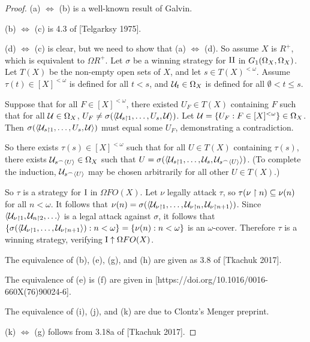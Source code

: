 \documentclass[11pt]{article}
\theoremstyle{plain}
\theoremstyle{definition}
\theoremstyle{remark}
\theoremstyle{plain}
\theoremstyle{definition}
\theoremstyle{remark}
\begin{document}
\begin{proof}
  (a) \(\Leftrightarrow\) (b) is a well-known result of Galvin.

  (b) \(\Leftrightarrow\) (c) is 4.3 of [Telgarksy 1975].
  
  (d) \(\Leftrightarrow\) (c) is clear, but we need to show that (a) \(\Leftrightarrow\) (d).
  So assume \(X\) is \(R^+\), which is equivalent to \(\Omega R^+\). 
  Let \(\sigma\) be a winning strategy for \(\mathrm{II}\) in 
  \(G_{1}(\Omega_X,\Omega_X)\). Let \(T(X)\) be the non-empty
  open sets of \(X\), and let \(s\in T(X)^{<\omega}\).
  Assume \(\tau(t)\in[X]^{<\omega}\) is defined for all \(t<s\),
  and \(\mathcal{U}_t\in\Omega_X\) is defined for all 
  \(\emptyset<t\leq s\). 

  Suppose that for all \(F\in[X]^{<\omega}\), there existed \(U_F\in T(X)\)
  containing \(F\) such that for all \(\mathcal{U}\in\Omega_X\),
  \(U_F\not=\sigma(\langle\mathcal{U}_{s\restriction 1},\dots,U_s,\mathcal{U}\rangle)\).
  Let \(\mathcal{U}=\{U_F:F\in[X]^{<\omega}\}\in\Omega_X\).
  Then \(\sigma(\langle\mathcal{U}_{s\restriction 1},\dots,U_s,\mathcal{U}\rangle)\)
  must equal some \(U_F\), demonstrating a contradiction.

  So there exists \(\tau(s)\in[X]^{<\omega}\) such that for all \(U\in T(X)\)
  containing \(\tau(s)\),
  there exists \(\mathcal{U}_{s{^\frown}\langle U\rangle}\in\Omega_X\) such that
  \(U=\sigma(\langle\mathcal{U}_{s\restriction 1},\dots,\mathcal{U}_s,\mathcal{U}_{s{^\frown}\langle U\rangle}\rangle)\).
  (To complete the induction, \(\mathcal{U}_{s{^\frown}\langle U\rangle}\) may be chosen
  arbitrarily for all other \(U\in T(X)\).)

  So \(\tau\) is a strategy for \(\mathrm{I}\) in \(\Omega FO(X)\).
  Let \(\nu\) legally attack \(\tau\), so
  \(\tau(\nu\restriction n)\subseteq \nu(n)\) for all \(n<\omega\).
  It follows that 
  \(\nu(n)=\sigma(\langle\mathcal{U}_{\nu\restriction 1},\dots,\mathcal{U}_{\nu\restriction n},\mathcal{U}_{\nu\restriction n+1}\rangle)\).
  Since \(\<\mc U_{\nu\rest 1},\mc U_{n\rest 2},\dots\>\) is a legal attack
  against \(\sigma\), it follows that
  \(\{\sigma(\langle\mathcal{U}_{\nu\restriction 1},\dots,\mathcal{U}_{\nu\restriction n+1}\rangle):n<\omega\}=\{\nu(n):n<\omega\}\)
  is an \(\omega\)-cover. Therefore \(\tau\) is a winning strategy, 
  verifying \(\mathrm{I}\uparrow\Omega FO(X)\).

  The equivalence of (b), (e), (g), and (h) are given as 3.8 of [Tkachuk 2017].

  The equivalence of (e) is (f) are given in [https://doi.org/10.1016/0016-660X(76)90024-6].
  
  The equivalence of (i), (j), and (k) are due to Clontz's Menger preprint.

  (k) \(\Leftrightarrow\) (g) follows from 3.18a of [Tkachuk 2017].
\end{proof}
\end{document}
